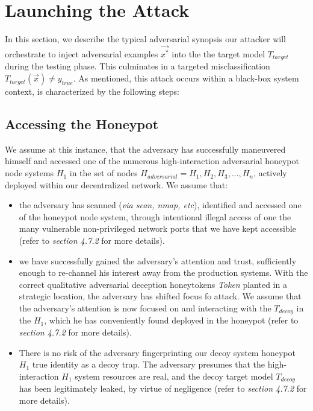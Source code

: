 \documentclass[grad,lot,lof,11pt,oneside,onehalfspace]{RUthesis}
\begin{document}
\section{Launching the Attack}
In this section, we describe the typical adversarial synopsis our attacker will orchestrate to inject adversarial examples $\vec{x^{*}}$ into the the target model \textit{$T_{target}$} during the testing phase. This culminates in a targeted misclassification $T_{target}(\vec{x}) \neq y_{true}$. As mentioned, this attack occurs within a black-box system context, is characterized by the following steps: 
\subsection{Accessing the Honeypot}
We assume at this instance, that the adversary has successfully maneuvered himself and accessed one of the numerous high-interaction adversarial honeypot node systems $H_{1}$ in the set of nodes $H_{adversarial}={H_{1}, H_{2}, H_{3},...,H_{n}}$, actively deployed within our decentralized network. We assume that:
\begin{itemize}
	\item the adversary has scanned (\textit{via scan, nmap, etc}), identified and accessed one of the honeypot node system,  through intentional illegal access of one the many vulnerable non-privileged network ports that we have kept accessible (refer to \textit{section 4.7.2} for more details).
	\item we have successfully gained the adversary's attention and trust, sufficiently enough to re-channel his interest away from the production systems. With the correct qualitative adversarial deception honeytokens \textit{Token} planted in a strategic location, the adversary has shifted focus fo attack. We assume that the adversary's attention is now focused on and interacting with the \textit{$T_{decoy}$} in the $H_{1}$, which he has conveniently found deployed in the honeypot (refer to \textit{section 4.7.2} for more details).
	\item There is no risk of the adversary fingerprinting our decoy system honeypot $H_{1}$ true identity as a decoy trap. The adversary presumes that the high-interaction $H_{1}$ system resources are real, and the decoy target model \textit{$T_{decoy}$} has been legitimately leaked, by virtue of negligence (refer to \textit{section 4.7.2} for more details).
\end{itemize}
\end{document}
